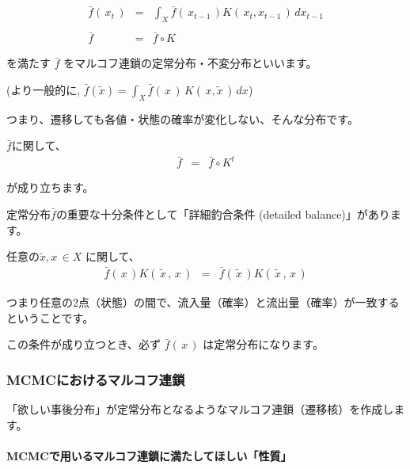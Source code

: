 \documentclass[
]{article}
\begin{document}
\[
\begin{eqnarray}
\bar{f}(\,x_t\,) &=&  \int_X \bar{f}(\,x_{t-1}\,) K(\,x_t,x_{t-1}\,)\, dx_{t-1}\\
\\
\bar{f} &=& \bar{f} \circ  K
\end{eqnarray}
\]

を満たす \(\bar{f}\) をマルコフ連鎖の定常分布・不変分布といいます。

(より一般的に,
\(\bar{f}(\tilde{x}) = \int_X \bar{f}(\,x\,) \,K(\,x,\tilde{x}\,)\, dx\))

つまり、遷移しても各値・状態の確率が変化しない、そんな分布です。

\(\bar{f}\)に関して、 \[
\begin{eqnarray}
\bar{f} &=& \bar{f} \circ  K^t
\end{eqnarray}
\]

が成り立ちます。

定常分布\(\bar{f}\)の重要な十分条件として「詳細釣合条件 (detailed
balance)」があります。

任意の\(\tilde{x},x\,\in X\) に関して、 \[
\begin{eqnarray}
\bar{f}(\,x\,) K(\,\tilde{x}\,,\,x\,)&=&\bar{f}(\,\tilde{x}\,) K(\,\tilde{x}\,,\,x\,)
\end{eqnarray}
\]

つまり任意の2点（状態）の間で、流入量（確率）と流出量（確率）が一致するということです。

この条件が成り立つとき、必ず \(\bar{f}(\,x\,)\) は定常分布になります。

\hypertarget{mcmcux306bux304aux3051ux308bux30deux30ebux30b3ux30d5ux9023ux9396}{%
\subsubsection{\texorpdfstring{\textbf{MCMCにおけるマルコフ連鎖}}{MCMCにおけるマルコフ連鎖}}\label{mcmcux306bux304aux3051ux308bux30deux30ebux30b3ux30d5ux9023ux9396}}

「欲しい事後分布」が定常分布となるようなマルコフ連鎖（遷移核）を作成します。

\hypertarget{mcmcux3067ux7528ux3044ux308bux30deux30ebux30b3ux30d5ux9023ux9396ux306bux6e80ux305fux3057ux3066ux307bux3057ux3044ux6027ux8cea}{%
\paragraph{\texorpdfstring{\textbf{MCMCで用いるマルコフ連鎖に満たしてほしい「性質」}}{MCMCで用いるマルコフ連鎖に満たしてほしい「性質」}}\label{mcmcux3067ux7528ux3044ux308bux30deux30ebux30b3ux30d5ux9023ux9396ux306bux6e80ux305fux3057ux3066ux307bux3057ux3044ux6027ux8cea}}
\end{document}
